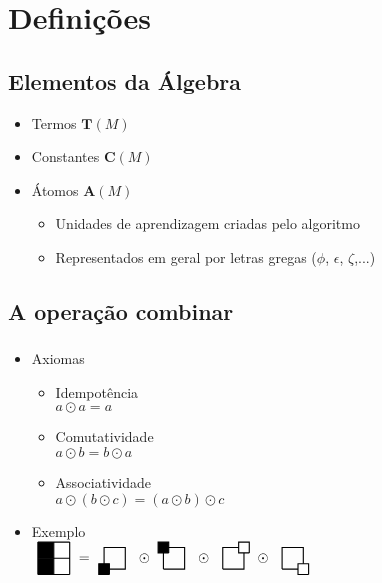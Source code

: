 \section{Definições}
\subsection*{Elementos da Álgebra}
\begin{frame}{\subsecname}
\begin{itemize}
    \item<2-> Termos $\mathbf{T}(M)$\\\vspace{2 mm}
    \allTerms
    \item<3-> Constantes $\mathbf{C}(M)$ \\\vspace{2 mm}
    \allConstants
    \item<4-> Átomos $\mathbf{A}(M)$
    \begin{itemize}
        \item<4-> Unidades de aprendizagem criadas pelo algoritmo
        \item<5-> Representados em geral por letras gregas ($\phi$, $\epsilon$, $\zeta$,...)
    \end{itemize}
\end{itemize}
\end{frame}
\subsection*{A operação combinar}
\begin{frame}
    \frametitle{\subsecname}
    \begin{itemize}
        \item<2-> Axiomas
        \begin{itemize}
            \item<2-> Idempotência\\
                \quad $a \odot a = a$
            \item<3-> Comutatividade\\
                \quad $a \odot b = b \odot a$
            \item<4-> Associatividade\\
                \quad $a \odot (b \odot c) = (a \odot b) \odot c$
        \end{itemize}
        \item<5-> Exemplo\\\vspace{2 mm}
        {\renewcommand*{\TermScale}{0.4}
    $
        \vcenter{\hbox{\BBWW}}
        =
        \vcenter{\hbox{\constant{1/3/black}}}
        \odot
        \vcenter{\hbox{\constant{1/1/black}}}
        \odot
        \vcenter{\hbox{\constant{3/1/white}}}
        \odot
        \vcenter{\hbox{\constant{3/3/white}}}
    $}
    \end{itemize}
\end{frame}